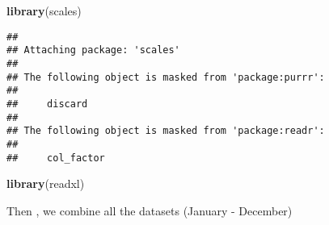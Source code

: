 \documentclass[
]{article}
\newenvironment{Shaded}{\begin{snugshade}}{\end{snugshade}}
\newcommand{\FunctionTok}[1]{\textcolor[rgb]{0.13,0.29,0.53}{\textbf{#1}}}
\newcommand{\NormalTok}[1]{#1}
\begin{document}
\begin{Shaded}
\begin{Highlighting}[]
\FunctionTok{library}\NormalTok{(scales)}
\end{Highlighting}
\end{Shaded}

\begin{verbatim}
## 
## Attaching package: 'scales'
## 
## The following object is masked from 'package:purrr':
## 
##     discard
## 
## The following object is masked from 'package:readr':
## 
##     col_factor
\end{verbatim}

\begin{Shaded}
\begin{Highlighting}[]
\FunctionTok{library}\NormalTok{(readxl)}
\end{Highlighting}
\end{Shaded}

Then , we combine all the datasets (January - December)
\end{document}
